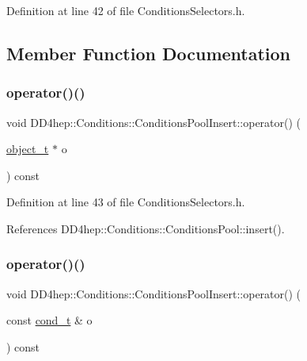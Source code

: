 Definition at line 42 of file Conditions\+Selectors.\+h.



\subsection{Member Function Documentation}
\hypertarget{class_d_d4hep_1_1_conditions_1_1_conditions_pool_insert_a197dc9c63b9ed4cebd2d8bc852584881}{}\label{class_d_d4hep_1_1_conditions_1_1_conditions_pool_insert_a197dc9c63b9ed4cebd2d8bc852584881} 
\subsubsection{\texorpdfstring{operator()()}{operator()()}\hspace{0.1cm}{\footnotesize\ttfamily [1/4]}}
{\footnotesize\ttfamily void D\+D4hep\+::\+Conditions\+::\+Conditions\+Pool\+Insert\+::operator() (\begin{DoxyParamCaption}\item[{\hyperlink{class_d_d4hep_1_1_conditions_1_1_cond_____oper_a4229491e49bfd21058dff10125a73f63}{object\+\_\+t} $\ast$}]{o }\end{DoxyParamCaption}) const\hspace{0.3cm}{\ttfamily [inline]}}



Definition at line 43 of file Conditions\+Selectors.\+h.



References D\+D4hep\+::\+Conditions\+::\+Conditions\+Pool\+::insert().

\hypertarget{class_d_d4hep_1_1_conditions_1_1_conditions_pool_insert_a8dd7e9d5a5f0c593ee2fc1df9e37b9b2}{}\label{class_d_d4hep_1_1_conditions_1_1_conditions_pool_insert_a8dd7e9d5a5f0c593ee2fc1df9e37b9b2} 
\subsubsection{\texorpdfstring{operator()()}{operator()()}\hspace{0.1cm}{\footnotesize\ttfamily [2/4]}}
{\footnotesize\ttfamily void D\+D4hep\+::\+Conditions\+::\+Conditions\+Pool\+Insert\+::operator() (\begin{DoxyParamCaption}\item[{const \hyperlink{class_d_d4hep_1_1_conditions_1_1_cond_____oper_aceca9f6a0e8c84364946eace47275d09}{cond\+\_\+t} \&}]{o }\end{DoxyParamCaption}) const\hspace{0.3cm}{\ttfamily [inline]}}




